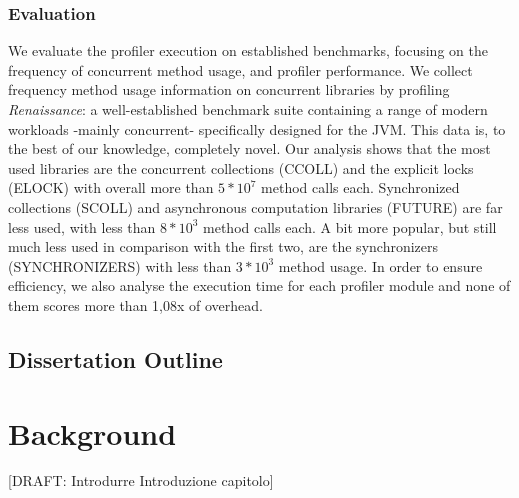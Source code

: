 \documentclass[]{usiinfthesis}
\begin{document}
\subsection{Evaluation}
We evaluate the profiler execution on established benchmarks, focusing on the frequency of concurrent method usage, and profiler performance. We collect frequency method usage information on concurrent libraries by profiling \textit{Renaissance}: a well-established benchmark suite containing a range of modern workloads -mainly concurrent- specifically designed for the JVM. This data is, to the best of our knowledge, completely novel. Our analysis shows that the most used libraries are the concurrent collections (CCOLL) and the explicit locks (ELOCK) with overall more than \(5*10^7\) method calls each. Synchronized collections (SCOLL) and asynchronous computation libraries (FUTURE) are far less used, with less than \(8*10^3\) method calls each. A bit more popular, but still much less used in comparison with the first two, are the synchronizers (SYNCHRONIZERS) with less than \(3*10^3\) method usage. In order to ensure efficiency, we also analyse the execution time for each profiler module and none of them scores more than 1,08x of overhead.

\section{Dissertation Outline}

\chapter{Background}

[DRAFT: Introdurre Introduzione capitolo]
\end{document}
